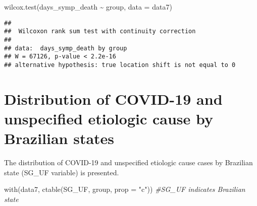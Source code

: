 \documentclass[
]{article}
\newenvironment{Shaded}{\begin{snugshade}}{\end{snugshade}}
\newcommand{\AttributeTok}[1]{\textcolor[rgb]{0.77,0.63,0.00}{#1}}
\newcommand{\CommentTok}[1]{\textcolor[rgb]{0.56,0.35,0.01}{\textit{#1}}}
\newcommand{\FunctionTok}[1]{\textcolor[rgb]{0.00,0.00,0.00}{#1}}
\newcommand{\NormalTok}[1]{#1}
\newcommand{\SpecialCharTok}[1]{\textcolor[rgb]{0.00,0.00,0.00}{#1}}
\newcommand{\StringTok}[1]{\textcolor[rgb]{0.31,0.60,0.02}{#1}}
\begin{document}
\begin{Shaded}
\begin{Highlighting}[]
\FunctionTok{wilcox.test}\NormalTok{(days\_symp\_death }\SpecialCharTok{\textasciitilde{}}\NormalTok{ group, }\AttributeTok{data =}\NormalTok{ data7)}
\end{Highlighting}
\end{Shaded}

\begin{verbatim}
## 
##  Wilcoxon rank sum test with continuity correction
## 
## data:  days_symp_death by group
## W = 67126, p-value < 2.2e-16
## alternative hypothesis: true location shift is not equal to 0
\end{verbatim}

\hypertarget{distribution-of-covid-19-and-unspecified-etiologic-cause-by-brazilian-states}{%
\section{Distribution of COVID-19 and unspecified etiologic cause by
Brazilian
states}\label{distribution-of-covid-19-and-unspecified-etiologic-cause-by-brazilian-states}}

The distribution of COVID-19 and unspecified etiologic cause cases by
Brazilian state (SG\_UF variable) is presented.

\begin{Shaded}
\begin{Highlighting}[]
\FunctionTok{with}\NormalTok{(data7, }\FunctionTok{ctable}\NormalTok{(SG\_UF, group, }\AttributeTok{prop =} \StringTok{"c"}\NormalTok{)) }\CommentTok{\#SG\_UF indicates Brazilian state}
\end{Highlighting}
\end{Shaded}
\end{document}
